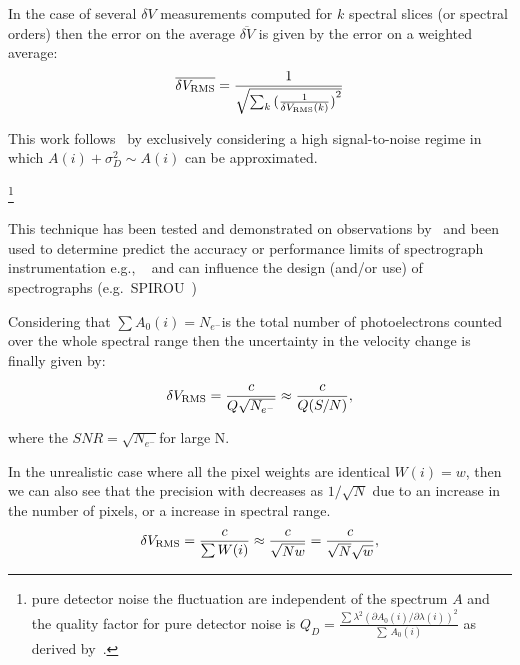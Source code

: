 In the case of several \(\delta V\) measurements computed for \(k\) spectral slices (or spectral orders) then the error on the average \(\overline{\delta V}\) is given by the error on a weighted average:
\begin{equation}
\overline{\delta {V}_{\textrm{RMS}}} = \frac{1}{\sqrt{\sum_k{{(\frac{1}{\delta V_{\textrm{RMS}}(k)})}^{2}}}}
\end{equation}


This work follows~\cite{figueira_radial_2016} by exclusively considering a high signal-to-noise regime in which \(A(i) + \sigma_{D}^{2} \sim A(i)\) can be approximated.


\footnote{pure detector noise the fluctuation are independent of the spectrum \(A\) and the quality factor for pure detector noise is \(Q_D = \frac{\sum{\lambda^{2} {(\partial A_0(i)/\partial \lambda(i))}^{2}}}{\sum{\, A_0(i)}}\) as derived by~\cite{connes_absolute_1985}. }


This technique has been tested and demonstrated on observations by~\citet{connes_demonstration_1996} and been used to determine predict the accuracy or performance limits of spectrograph instrumentation e.g., ~\citet{connes_absolute_1985,bouchy_fundamental_2001} and can influence the design (and/or use) of spectrographs
 (e.g.\ SPIROU~\citep{artigau_spirou_2014,figueira_radial_2016})


Considering that \(\sum{A_0(i)} = N_{e^-}\)is the total number of photoelectrons counted over the whole spectral range then the uncertainty in the velocity change is finally given by:

\begin{equation}
\delta V_{\textrm{RMS}} = \frac{c}{Q \sqrt{N_{e^-}}} \approx \frac{c}{Q (S/N)}, \label{eq:rv_SNR}
\end{equation}

where the \({SNR}=\sqrt{N_{e^-}}\)for large N. 


In the unrealistic case where all the pixel weights are identical $W(i)=w$, then we can also see that the precision with decreases as $1/\sqrt{N}$ due to an increase in the number of pixels, or a increase in spectral range.
 \begin{equation}
 \delta V_{\textrm{RMS}} = \frac{c}{\sum{W(i)}} \approx \frac{c}{\sqrt{N w}}=  \frac{c}{\sqrt{N}\sqrt{w}}, \label{eq:sqrtN}
 \end{equation}


